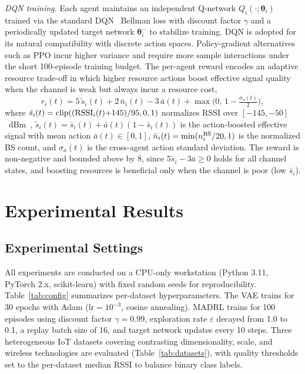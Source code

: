 \documentclass[conference]{IEEEtran}
\begin{document}
\textit{DQN training.}
Each agent maintains an independent Q-network $Q_i(\cdot;\bm{\theta}_i)$
trained via the standard DQN~\cite{ref_dqn} Bellman loss with discount factor $\gamma$
and a periodically updated target network $\bm{\theta}_i^-$
to stabilize training. DQN is adopted for its natural compatibility with
discrete action spaces. Policy-gradient alternatives such as PPO
incur higher variance and require more sample interactions under the
short 100-episode training budget. The per-agent reward encodes an adaptive resource trade-off in which
higher resource actions boost effective signal quality when the channel
is weak but always incur a resource cost,
\vspace{-5pt}
\begin{equation}
r_i(t) = 5\,\tilde{s}_i(t) + 2\,\bar{n}_i(t)
        - 3\,\bar{a}(t)
        + \max\!\bigl(0,\,1 - \tfrac{\sigma_a(t)}{2}\bigr),
\label{eq:reward}
\end{equation}
\vspace{-4pt}
where $\bar{s}_i(t)=\mathrm{clip}(({\rm RSSI}_i(t){+}145)/95,0,1)$ normalizes RSSI over $[-145,-50]$~dBm~\cite{ref_iot_overview}, $\tilde{s}_i(t)=\bar{s}_i(t)+\bar{a}(t)(1-\bar{s}_i(t))$ is the action-boosted effective signal with mean action $\bar{a}(t)\in[0,1]$, $\bar{n}_i(t)=\min(n_i^{\rm BS}/20,1)$ is the normalized BS count, and $\sigma_a(t)$ is the cross-agent action standard deviation. The reward is non-negative and bounded above by 8, since $5\tilde{s}_i - 3\bar{a} \geq 0$ holds for all channel states, and boosting resources is beneficial only when the channel is poor (low $\bar{s}_i$).

\vspace{-6pt}
\section{Experimental Results}
\label{sec:experiments}

\vspace{-4pt}
\subsection{Experimental Settings}

All experiments are conducted on a CPU-only workstation (Python 3.11, PyTorch 2.x, scikit-learn) with fixed random seeds for reproducibility.
Table~\ref{tab:config} summarizes per-dataset hyperparameters. The VAE trains for
30 epochs with Adam ($\mathrm{lr}=10^{-3}$, cosine annealing). MADRL trains for 100 episodes using discount factor $\gamma=0.99$,
exploration rate $\varepsilon$ decayed from 1.0 to 0.1, a replay batch
size of 16, and target network updates every 10 steps.
Three heterogeneous IoT datasets covering contrasting dimensionality, scale, and wireless technologies are evaluated (Table~\ref{tab:datasets}), with quality thresholds set to the per-dataset median RSSI to balance binary class labels.
\end{document}
